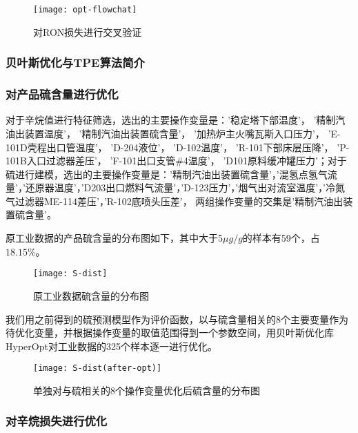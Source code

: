 \documentclass[bwprint]{gmcmthesis}
\begin{document}
\begin{figure}[htb]
	\centering
	\texttt{[image: opt-flowchat]}
	\caption{对RON损失进行交叉验证}
	\label{img:opt-flowchat}
\end{figure}




\FloatBarrier
\subsubsection{贝叶斯优化与TPE算法简介}

\FloatBarrier
\subsubsection{对产品硫含量进行优化}

对于辛烷值进行特征筛选，选出的主要操作变量是：'稳定塔下部温度'， '精制汽油出装置温度'， '精制汽油出装置硫含量'， '加热炉主火嘴瓦斯入口压力'， 'E-101D壳程出口管温度'， 'D-204液位'， 'D-102温度'， 'R-101下部床层压降'， 'P-101B入口过滤器差压'， 'F-101出口支管\#4温度'， 'D101原料缓冲罐压力'；对于硫进行建模，选出的主要操作变量是：'精制汽油出装置硫含量'，'混氢点氢气流量'，'还原器温度'，'D203出口燃料气流量'，'D-123压力'，'烟气出对流室温度'，'冷氮气过滤器ME-114差压'，'R-102底喷头压差'， 两组操作变量的交集是'精制汽油出装置硫含量'。

原工业数据的产品硫含量的分布图如下，其中大于5$\mu g/g$的样本有59个，占 $18.15\%$。

\begin{figure}[htb]
	\centering
	\texttt{[image: S-dist]}
	\caption{原工业数据硫含量的分布图}
\end{figure}

我们用之前得到的硫预测模型作为评价函数，以与硫含量相关的8个主要变量作为待优化变量，并根据操作变量的取值范围得到一个参数空间，用贝叶斯优化库HyperOpt对工业数据的325个样本逐一进行优化。



\begin{figure}[htb]
	\centering
	\texttt{[image: S-dist(after-opt)]}
	\caption{单独对与硫相关的8个操作变量优化后硫含量的分布图}
\end{figure}




\FloatBarrier
\subsubsection{对辛烷损失进行优化}
\end{document}
